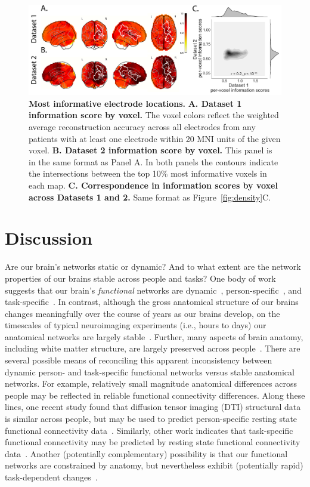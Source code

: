 \documentclass[11pt]{article}
\begin{document}
\begin{figure}
  \centering
  \includegraphics[width=\textwidth]{figs/informap}
  \caption{\textbf{Most informative electrode locations.}
    \textbf{A. Dataset 1 information score by voxel.} The voxel colors
    reflect the weighted average reconstruction accuracy across all
    electrodes from any patients with at least one electrode within 20
    MNI units of the given voxel.  \textbf{B. Dataset 2 information
      score by voxel.}  This panel is in the same format as Panel A.
    In both panels the contours indicate the intersections between
    the top 10\% most informative voxels in each map.
    \textbf{C. Correspondence in information scores by voxel across
      Datasets 1 and 2.}  Same format as Figure~\ref{fig:density}C.}
  \label{fig:informap}
\end{figure}

\section*{Discussion}
Are our brain's networks static or dynamic?  And to what extent are
the network properties of our brains stable across people and tasks?
One body of work suggests that our brain's \textit{functional}
networks are dynamic~\citep[e.g., ][]{MannEtal18},
person-specific~\citep[e.g., ][]{FinnEtal15}, and
task-specific~\citep[e.g., ][]{Turk13}.  In contrast, although the
gross anatomical structure of our brains changes meaningfully over the
course of years as our brains develop, on the timescales of typical
neuroimaging experiments (i.e., hours to days) our anatomical networks
are largely stable~\citep[e.g., ][]{CaseEtal00}.  Further, many
aspects of brain anatomy, including white matter structure, are largely
preserved across people~\citep[e.g., ][]{TalaTour88, JahaEtal13,
  MoriEtal08}. There are several possible means of reconciling this
apparent inconsistency between dynamic person- and task-specific
functional networks versus stable anatomical networks.  For example,
relatively small magnitude anatomical differences across people may be
reflected in reliable functional connectivity differences.  Along
these lines, one recent study found that diffusion tensor imaging
(DTI) structural data is similar across people, but may be used to
predict person-specific resting state functional connectivity
data~\citep{BeckEtal18}.  Similarly, other work indicates that
task-specific functional connectivity may be predicted by resting
state functional connectivity data~\citep{ColeEtal16, TavoEtal16}.  Another
(potentially complementary) possibility is that our functional
networks are constrained by anatomy, but nevertheless exhibit
(potentially rapid) task-dependent changes~\citep[e.g.,
][]{SporBetz16}.
\end{document}
